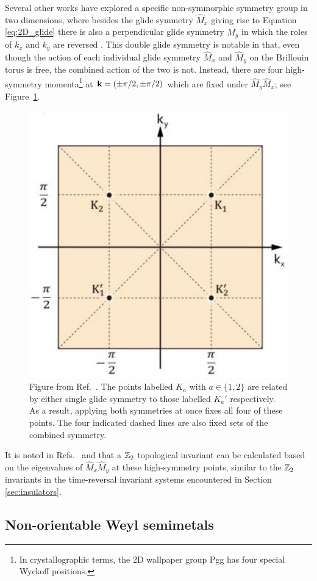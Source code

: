 Several other works have explored a specific non-symmorphic symmetry group in two dimensions, where besides the glide symmetry $\hat{M}_x$ giving rise to Equation \eqref{eq:2D_glide} there is also a perpendicular glide symmetry $\hat{M}_y$ in which the roles of $k_x$ and $k_y$ are reversed \cite{HZY_RP2,WangZhang_acoustic-Klein-2D,Tao_quadrupole}. This double glide symmetry is notable in that, even though the action of each individual glide symmetry $\hat{M}_x$ and $\hat{M}_y$ on the Brillouin torus is free, the combined action of the two is not. Instead, there are four high-symmetry momenta\footnote{
	In crystallographic terms, the 2D wallpaper group Pgg has four special Wyckoff positions.}
at $\vb{k} = (\pm\pi/2,\pm\pi/2)$ which are fixed under $\hat{M}_y\hat{M}_x$; see Figure~\ref{fig:Pgg-fixed-points}.
\begin{figure}[htb!]
	\centering
	\includegraphics[width=.5\linewidth]{Images/Pgg-fixed-points}
	\caption{Figure from Ref.~\cite{WangZhang_acoustic-Klein-2D}. The points labelled $K_a$ with $a\in\{1,2\}$ are related by either single glide symmetry to those labelled $K_a'$ respectively. As a result, applying both symmetries at once fixes all four of these points. The four indicated dashed lines are also fixed sets of the combined symmetry.} %
	\label{fig:Pgg-fixed-points}
\end{figure}
It is noted in Refs.~\cite{HZY_RP2} and \cite{WangZhang_acoustic-Klein-2D} that a $\mathbb{Z}_2$ topological invariant can be calculated based on the eigenvalues of $\hat{M}_x\hat{M}_y$ at these high-symmetry points, similar to the $\mathbb{Z}_2$ invariants in the time-reversal invariant systems encountered in Section \ref{sec:insulators}.

\subsection{Non-orientable Weyl semimetals}

